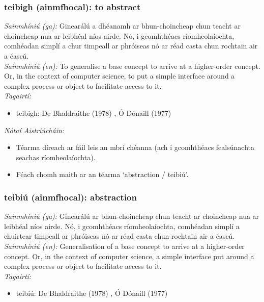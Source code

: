 \subsubsection*{teibigh (ainmfhocal): to abstract}
 \noindent \textit{Sainmhíniú (ga):} Ginearálú a dhéanamh ar bhun-choincheap chun teacht ar choincheap nua ar leibhéal níos airde. Nó, i gcomhthéacs ríomheolaíochta, comhéadan simplí a chur timpeall ar phróiseas nó ar réad casta chun rochtain air a éascú.
\\
 \noindent \textit{Sainmhíniú (en):} To generalise a base concept to arrive at a higher-order concept. Or, in the context of computer science, to put a simple interface around a complex process or object to facilitate access to it.
\\
 \noindent \textit{Tagairtí:}
\begin{itemize}
	\item teibigh: De Bhaldraithe (1978) \cite{de-bhaldraithe}, Ó Dónaill (1977) \cite{odonaill}
\end{itemize}

 \noindent \textit{Nótaí Aistriúcháin:}
\begin{itemize}
	\item Téarma díreach ar fáil leis an mbrí chéanna (ach i gcomhthéacs fealsúnachta seachas ríomheolaíochta).
	\item Féach chomh maith ar an téarma `abstraction / teibiú'.
\end{itemize}


\subsubsection*{teibiú (ainmfhocal): abstraction}
 \noindent \textit{Sainmhíniú (ga):} Ginearálú ar bhun-choincheap chun teacht ar choincheap nua ar leibhéal níos airde. Nó, i gcomhthéacs ríomheolaíochta, comhéadan simplí a chuirtear timpeall ar phróiseas nó ar réad casta chun rochtain air a éascú.
\\
 \noindent \textit{Sainmhíniú (en):} Generalisation of a base concept to arrive at a higher-order concept. Or, in the context of computer science, a simple interface put around a complex process or object to facilitate access to it.
\\
 \noindent \textit{Tagairtí:}
\begin{itemize}
	\item teibiú: De Bhaldraithe (1978) \cite{de-bhaldraithe}, Ó Dónaill (1977) \cite{odonaill}
\end{itemize}


